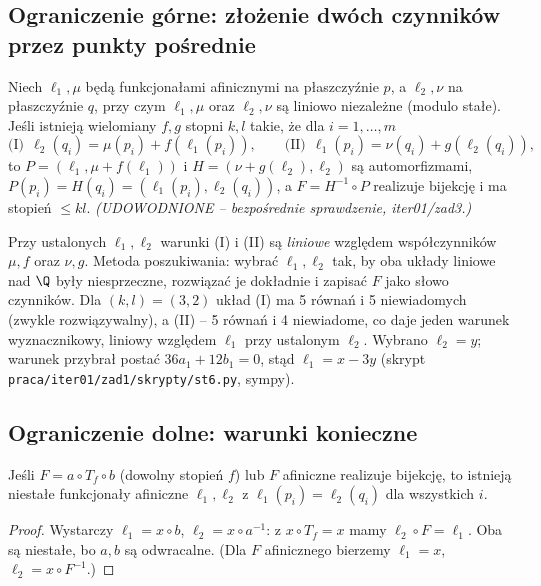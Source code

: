 \subsection{Ograniczenie górne: złożenie dwóch czynników przez punkty pośrednie}
\begin{lemat}\label{lem:konstr}
Niech $\ell_1,\mu$ będą funkcjonałami afinicznymi na płaszczyźnie $p$, a $\ell_2,\nu$ na płaszczyźnie
$q$, przy czym $\ell_1,\mu$ oraz $\ell_2,\nu$ są liniowo niezależne (modulo stałe). Jeśli
istnieją wielomiany $f,g$ stopni $k,l$ takie, że dla $i=1,\dots,m$
\[
\text{(I)}\ \ \ell_2(q_i)=\mu(p_i)+f(\ell_1(p_i)),\qquad
\text{(II)}\ \ \ell_1(p_i)=\nu(q_i)+g(\ell_2(q_i)),
\]
to $P=(\ell_1,\mu+f(\ell_1))$ i $H=(\nu+g(\ell_2),\ell_2)$ są automorfizmami, $P(p_i)=H(q_i)=
(\ell_1(p_i),\ell_2(q_i))$, a $F=H^{-1}\circ P$ realizuje bijekcję i ma stopień $\le kl$.
\emph{(UDOWODNIONE -- bezpośrednie sprawdzenie, iter01/zad3.)}
\end{lemat}
Przy ustalonych $\ell_1,\ell_2$ warunki (I) i (II) są \emph{liniowe} względem współczynników
$\mu,f$ oraz $\nu,g$. Metoda poszukiwania: wybrać $\ell_1,\ell_2$ tak, by oba układy liniowe nad
$\Q$ były niesprzeczne, rozwiązać je dokładnie i zapisać $F$ jako słowo czynników.
Dla $(k,l)=(3,2)$ układ (I) ma 5 równań i 5 niewiadomych (zwykle rozwiązywalny), a (II) -- 5 równań
i 4 niewiadome, co daje jeden warunek wyznacznikowy, liniowy względem $\ell_1$ przy ustalonym
$\ell_2$. Wybrano $\ell_2=y$; warunek przybrał postać $36a_1+12b_1=0$, stąd $\ell_1=x-3y$
(skrypt \texttt{praca/iter01/zad1/skrypty/st6.py}, sympy).

\subsection{Ograniczenie dolne: warunki konieczne}
\begin{lemat}[L1]\label{lem:L1}
Jeśli $F=a\circ T_f\circ b$ (dowolny stopień $f$) lub $F$ afiniczne realizuje bijekcję, to istnieją
niestałe funkcjonały afiniczne $\ell_1,\ell_2$ z $\ell_1(p_i)=\ell_2(q_i)$ dla wszystkich $i$.
\end{lemat}
\begin{proof}
Wystarczy $\ell_1=x\circ b$, $\ell_2=x\circ a^{-1}$: z $x\circ T_f=x$ mamy $\ell_2\circ F=\ell_1$.
Oba są niestałe, bo $a,b$ są odwracalne. (Dla $F$ afinicznego bierzemy $\ell_1=x$, $\ell_2=x\circ F^{-1}$.)
\end{proof}

